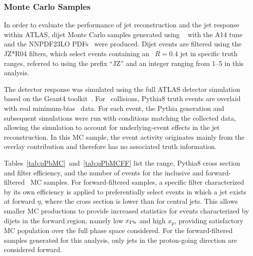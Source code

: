 \subsubsection{Monte Carlo Samples}
\label{sec:p}
In order to evaluate the performance of jet reconstruction and the jet response within ATLAS, dijet Monte Carlo samples generated using \pythia~\cite{Bierlich:2022pfr} with the A14 tune and the NNPDF23LO PDFs~\cite{Ball:2012cx} were produced. Dijet events are filtered using the JZ$*$R04 filters, which select events containing an \antikt\ $R=0.4$ jet in specific truth \PT{} ranges, referred to using the prefix ``JZ'' and an integer ranging from 1--5 in this analysis.

The detector response was simulated using the full ATLAS detector simulation based on the Geant4 toolkit~\cite{Agostinelli:2002hh}. For \pxPb\ collisions, Pythia8 truth events are overlaid with real minimum-bias \pxPb\ data. For each event, the Pythia generation and subsequent simulations were run with conditions matching the collected data, allowing the simulation to account for underlying-event effects in the jet reconstruction. In this MC sample, the event activity originates mainly from the overlay contribution and therefore has no associated truth information.

Tables~\ref{tab:pPbMC}~and~\ref{tab:pPbMCFF} list the \PT{} range, Pythia8 cross section and filter efficiency, and the number of events for the inclusive and forward-filtered \pxPb\ MC samples. For forward-filtered samples, a specific filter characterized by its own efficiency is applied to preferentially select events in which a jet exists at forward $\eta$, where the cross section is lower than for central jets. This allows smaller MC productions to provide increased statistics for events characterized by dijets in the forward region, namely low $x_{\text{Pb}}$ and high $x_p$, providing satisfactory MC population over the full phase space considered. For the forward-filtered samples generated for this analysis, only jets in the proton-going direction are considered forward.

